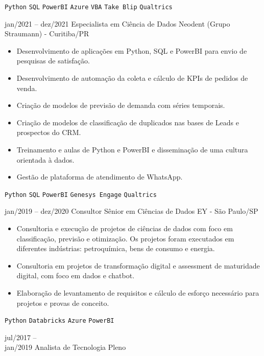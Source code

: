 \documentclass[9pt]{developercv} %
\begin{document}
\begin{entrylist}
{\begin{itemize}[noitemsep,topsep=0pt,parsep=0pt,partopsep=0pt, leftmargin=-1pt]
			\end{itemize} 
			\texttt{Python} \slashsep \texttt{SQL} \slashsep \texttt{PowerBI} \slashsep \texttt{Azure} \slashsep \texttt{VBA} \slashsep \texttt{Take Blip} \slashsep \texttt{Qualtrics}}
		\entry
		{jan/2021 -- dez/2021}
		{Especialista em Ciência de Dados}
		{Neodent (Grupo Straumann) - Curitiba/PR}
		{\vspace{-10pt}
			\begin{itemize}[noitemsep,topsep=0pt,parsep=0pt,partopsep=0pt, leftmargin=-1pt]
				\item Desenvolvimento de aplicações em Python, SQL e PowerBI  para envio de pesquisas de satisfação.
				\item Desenvolvimento de automação da coleta e cálculo de KPIs de pedidos de venda.
				\item Criação de modelos de previsão de demanda com séries temporais.
				\item Criação de modelos de classificação de duplicados nas bases de Leads e prospectos do CRM.
				\item Treinamento e aulas de Python e PowerBI e disseminação de uma cultura orientada à dados.
				\item Gestão de plataforma de atendimento de WhatsApp.
			\end{itemize} 
			\texttt{Python} \slashsep \texttt{SQL} \slashsep \texttt{PowerBI} \slashsep \texttt{Genesys Engage} \slashsep \texttt{Qualtrics}}
		\entry
		{jan/2019 -- dez/2020}
		{Consultor Sênior em Ciências de Dados}
		{EY - São Paulo/SP}
		{\vspace{-10pt}
			\begin{itemize}[noitemsep,topsep=0pt,parsep=0pt,partopsep=0pt, leftmargin=-1pt]
				\item Consultoria e execução de projetos de ciências de dados com foco em classificação, previsão e otimização. Os projetos foram executados em diferentes indústrias: petroquímica, bens de consumo e energia.
				\item Consultoria em projetos de transformação digital e assessment de maturidade digital, com foco em dados e chatbot.
				\item Elaboração de levantamento de requisitos e cálculo de esforço necessário para projetos e provas de conceito.
			\end{itemize} 
			\texttt{Python} \slashsep \texttt{Databricks} \slashsep \texttt{Azure} \slashsep \texttt{PowerBI}}
		\entry
		{jul/2017 -- \\jan/2019}
		{Analista de Tecnologia Pleno}

\end{entrylist}
\end{document}
